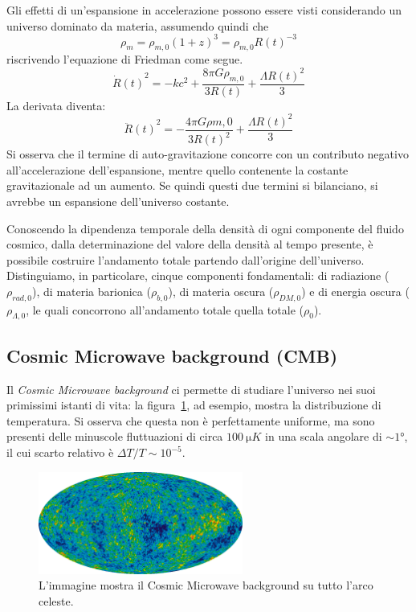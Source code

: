 Gli effetti di un'espansione in accelerazione possono essere visti considerando un universo dominato da materia, assumendo quindi che
\[
    \rho_{m} = \rho_{m, 0}{(1+z)}^3 = \rho_{m,0}{R(t)}^{-3}
\]
riscrivendo l'equazione di Friedman come segue.
\[
    {\dot{R}(t)}^2 = - kc^2 + \frac{8\pi G \rho_{m,0}}{3R(t)} + \frac{\Lambda {R(t)}^2}{3}
\]
La derivata diventa:
\[
    {\ddot{R}(t)}^2 = -\frac{4\pi G \rho{m,0}}{3{R(t)}^2}+ \frac{\Lambda {R(t)}^2}{3}
\]
Si osserva che il termine di auto-gravitazione concorre con un contributo negativo all'accelerazione dell'espansione, mentre quello contenente la costante gravitazionale ad un aumento. Se quindi questi due termini si bilanciano, si avrebbe un espansione dell'universo costante.

Conoscendo la dipendenza temporale della densità di ogni componente del fluido cosmico, dalla determinazione del valore della densità al tempo presente, è possibile costruire l'andamento totale partendo dall'origine dell'universo. Distinguiamo, in particolare, cinque componenti fondamentali: di radiazione ($\rho_{rad, 0}$), di materia barionica ($\rho_{b, 0}$), di materia oscura ($\rho_{DM, 0}$) e di energia oscura ($\rho_{\Lambda, 0}$, le quali concorrono all'andamento totale quella totale ($\rho_{0}$).

\subsection{Cosmic Microwave background (CMB)}\label{sec:CMB}
Il \textit{Cosmic Microwave background} ci permette di studiare l'universo nei suoi primissimi istanti di vita: la figura~\ref{fig:CMB1}, ad esempio, mostra la distribuzione di temperatura. Si osserva che questa non è perfettamente uniforme, ma sono presenti delle minuscole fluttuazioni di circa $\SI{100}{\micro K}$ in una scala angolare di $\sim 1\si{\degree}$, il cui scarto relativo è $\Delta T/T \sim 10^{-5}$.
\begin{figure}
    \centering
    \includegraphics[width = 0.6\textwidth]{immagini/CMB1.png}
    \caption{L'immagine mostra il Cosmic Microwave background su tutto l'arco celeste.}\label{fig:CMB1}
\end{figure}

